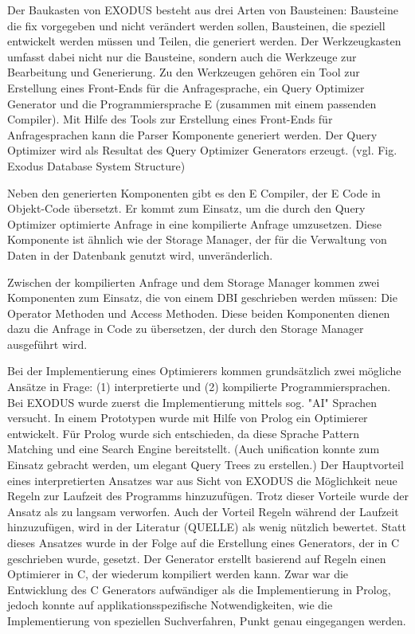 Der Baukasten von EXODUS besteht aus drei Arten von Bausteinen: Bausteine die fix vorgegeben und nicht verändert werden sollen, Bausteinen, die speziell entwickelt werden müssen und Teilen, die generiert werden. Der Werkzeugkasten umfasst dabei nicht nur die Bausteine, sondern auch die Werkzeuge zur Bearbeitung und Generierung. Zu den Werkzeugen gehören ein Tool zur Erstellung eines Front-Ends für die Anfragesprache, ein Query Optimizer Generator und die Programmiersprache E (zusammen mit einem passenden Compiler). Mit Hilfe des Tools zur Erstellung eines Front-Ends für Anfragesprachen kann die Parser Komponente generiert werden. Der Query Optimizer wird als Resultat des Query Optimizer Generators erzeugt. (vgl. Fig. Exodus Database System Structure)

Neben den generierten Komponenten gibt es den E Compiler, der E Code in Objekt-Code übersetzt. Er kommt zum Einsatz, um die durch den Query Optimizer optimierte Anfrage in eine kompilierte Anfrage umzusetzen. Diese Komponente ist ähnlich wie der Storage Manager, der für die Verwaltung von Daten in der Datenbank genutzt wird, unveränderlich. 

Zwischen der kompilierten Anfrage und dem Storage Manager kommen zwei Komponenten zum Einsatz, die von einem DBI geschrieben werden müssen: Die Operator Methoden und Access Methoden. Diese beiden Komponenten dienen dazu die Anfrage in Code zu übersetzen, der durch den  Storage Manager ausgeführt wird.

Bei der Implementierung eines Optimierers kommen grundsätzlich zwei mögliche Ansätze in Frage: (1) interpretierte und (2) kompilierte Programmiersprachen. Bei EXODUS wurde zuerst die Implementierung mittels sog. "AI" Sprachen versucht. In einem Prototypen wurde mit Hilfe von Prolog ein Optimierer entwickelt. Für Prolog wurde sich entschieden, da diese Sprache Pattern Matching und eine Search Engine bereitstellt. (Auch unification konnte zum Einsatz gebracht werden, um elegant Query Trees zu erstellen.) Der Hauptvorteil eines interpretierten Ansatzes war aus Sicht von EXODUS die Möglichkeit neue Regeln zur Laufzeit des Programms hinzuzufügen. Trotz dieser Vorteile wurde der Ansatz als zu langsam verworfen. Auch der Vorteil Regeln während der Laufzeit hinzuzufügen, wird in der Literatur (QUELLE) als wenig nützlich bewertet. Statt dieses Ansatzes wurde in der Folge auf die Erstellung eines Generators, der in C geschrieben wurde, gesetzt. Der Generator erstellt basierend auf Regeln einen Optimierer in C, der wiederum kompiliert werden kann. Zwar war die Entwicklung des C Generators aufwändiger als die Implementierung in Prolog, jedoch konnte auf applikationsspezifische Notwendigkeiten, wie die Implementierung von speziellen Suchverfahren, Punkt genau eingegangen werden.


